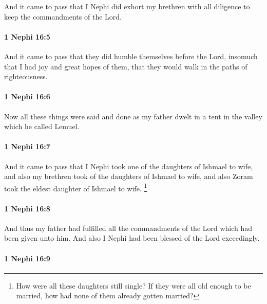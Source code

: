			And it came to pass that I Nephi did exhort my brethren with all diligence
			to keep the commandments of the Lord.

		\paragraph{1 Nephi 16:5} %
			\label{1NEPHI-16-5}

			And it came to pass that they did humble themselves before the Lord,
			insomuch that I had joy and great hopes of them,
			that they would walk in the paths of righteousness.

		\paragraph{1 Nephi 16:6} %
			\label{1NEPHI-16-6}

			Now all these things were said and done
			as my father dwelt in a tent in the valley which he called Lemuel.

		\paragraph{1 Nephi 16:7} %
			\label{1NEPHI-16-7}

			And it came to pass that I Nephi took one of the daughters of Ishmael to wife,
			and also my brethren took of the daughters of Ishmael to wife,
			and also Zoram took the eldest daughter of Ishmael to wife.%
				\footnote{%
					\label{1NEPHI-16-7-NOTE-daughters}%
					How were all these daughters still single? If they were all old enough to be married, how had none of them already gotten married?
					}

		\paragraph{1 Nephi 16:8} %
			\label{1NEPHI-16-8}

			And thus my father had fulfilled all the commandments of the Lord
			which had been given unto him.
			And also I Nephi had been blessed of the Lord exceedingly.

		\paragraph{1 Nephi 16:9} %
			\label{1NEPHI-16-9}

